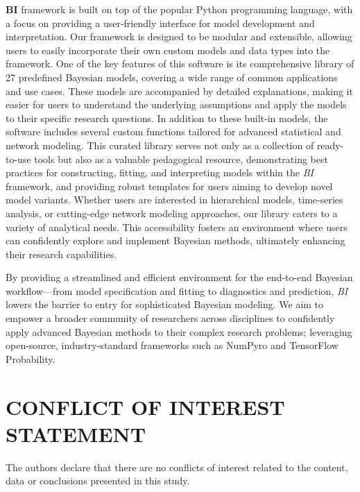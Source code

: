 \documentclass[num-refs]{wiley-article}
\begin{document}
\textbf{BI} framework is built on top of the popular Python programming language, with a focus on providing a user-friendly interface for model development and interpretation. Our framework is designed to be modular and extensible, allowing users to easily incorporate their own custom models and data types into the framework. One of the key features of this software is its comprehensive library of 27 predefined Bayesian models, covering a wide range of common applications and use cases. These models are accompanied by detailed explanations, making it easier for users to understand the underlying assumptions and apply the models to their specific research questions. In addition to these built-in models, the software includes several custom functions tailored for advanced statistical and network modeling. This curated library serves not only as a collection of ready-to-use tools but also as a valuable pedagogical resource, demonstrating best practices for constructing, fitting, and interpreting models within the \textit{BI} framework, and providing robust templates for users aiming to develop novel model variants. Whether users are interested in hierarchical models, time-series analysis, or cutting-edge network modeling approaches, our library caters to a variety of analytical needs. This accessibility fosters an environment where users can confidently explore and implement Bayesian methods, ultimately enhancing their research capabilities.

By providing a streamlined and efficient environment for the end-to-end Bayesian workflow—from model specification and fitting to diagnostics and prediction, \textit{BI} lowers the barrier to entry for sophisticated Bayesian modeling. We aim to empower a broader community of researchers across disciplines to confidently apply advanced Bayesian methods to their complex research problems; leveraging open-source, industry-standard frameworks such as NumPyro and TensorFlow Probability.




\section*{CONFLICT OF INTEREST STATEMENT}
The authors declare that there are no conflicts of interest related to the content, data or conclusions presented in this study.

\printendnotes


\end{document}
